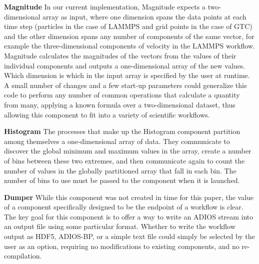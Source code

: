 \documentclass[conference]{IEEEtran}
\begin{document}
\textbf{Magnitude}
In our current implementation, Magnitude expects a two-dimensional array as
input, where one dimension spans the data points at each time step (particles
in the case of LAMMPS and grid points in the case of GTC) and the other
dimension spans any number of components of the same vector, for example the
three-dimensional components of velocity in the LAMMPS workflow. Magnitude
calculates the magnitudes of the vectors from the values of their individual
components and outputs a one-dimensional array of the new values. Which
dimension is which in the input array is specified by the user at runtime. A
small number of changes and a few start-up parameters could generalize this
code to perform any number of common operations that calculate a quantity from
many, applying a known formula over a two-dimensional dataset, thus allowing
this component to fit into a variety of scientific workflows.

\textbf{Histogram}
The processes that make up the Histogram component partition among themselves
a one-dimensional array of data. They communicate to discover the global
minimum and maximum values in the array, create a number of bins between these
two extremes, and then communicate again to count the number of values in the
globally partitioned array that fall in each bin. The number of bins to use
must be passed to the component when it is launched.


\textbf{Dumper}
While this component was not created in time for this paper, the value of a
component specifically designed to be the endpoint of a workflow is clear. The
key goal for this component is to offer a way to write an ADIOS stream into an
output file using some particular format. Whether to write the workflow output
as HDF5, ADIOS-BP, or a simple text file could simply be selected by the user
as an option, requiring no modifications to existing components, and no
re-compilation.
\end{document}
